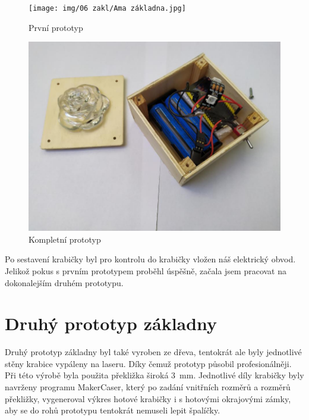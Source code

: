 \begin{figure}[htbp]
	\centering
	\begin{minipage}[b]{0.5\textwidth}
		\centering
		\texttt{[image: img/06 zakl/Ama základna.jpg]}
		\caption{První prototyp}
	\end{minipage}
	\qquad
	\begin{minipage}[b]{0.4\textwidth}
		\centering
		\includegraphics[width=1\textwidth]{img/06 zakl/1. prototyp s ele.jpg}
		\caption{Kompletní  prototyp}
	\end{minipage}
\end{figure}

Po sestavení krabičky byl pro kontrolu do krabičky vložen náš elektrický obvod.
Jelikož pokus s prvním prototypem proběhl úspěšně, začala jsem pracovat na dokonalejším druhém prototypu.


\section{Druhý prototyp základny }
Druhý prototyp základny byl také vyroben ze dřeva, tentokrát ale byly jednotlivé stěny krabice vypáleny na laseru. Díky čemuž prototyp působil profesionálněji. Při této výrobě byla použita překližka široká 3~mm. Jednotlivé díly krabičky byly navrženy programu MakerCaser, který po zadání vnitřních rozměrů a rozměrů překližky, vygeneroval výkres hotové krabičky i s hotovými okrajovými zámky, aby se do rohů prototypu tentokrát nemuseli lepit špalíčky. 

